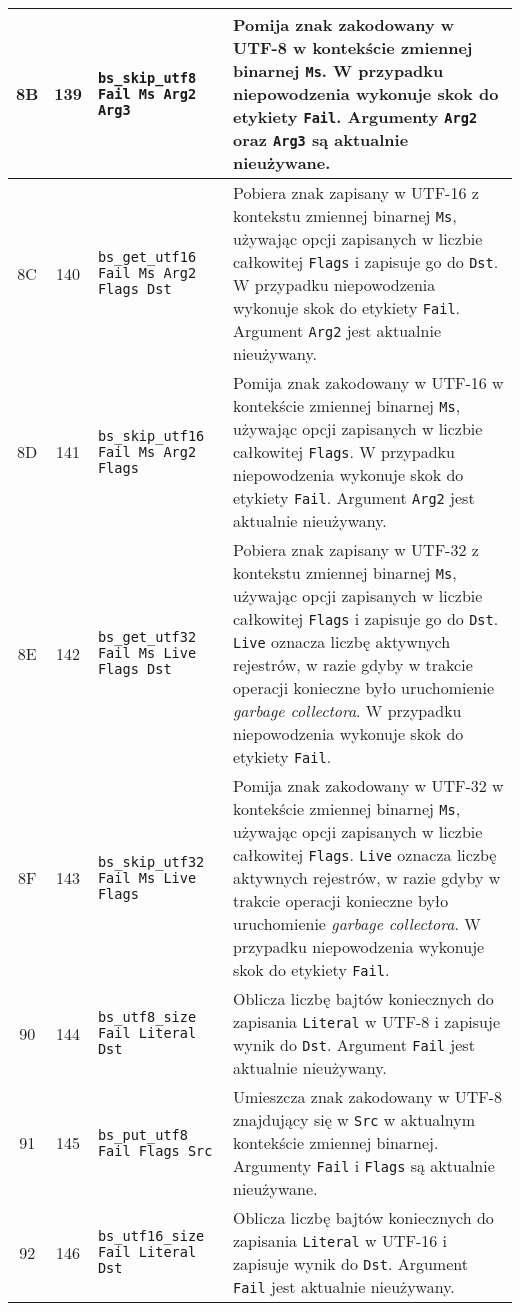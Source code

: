\begin{longtable}{|c|c|p{5cm}|p{7cm}|}
\hline
8B & 139 & \texttt{bs\_skip\_utf8 Fail Ms Arg2 Arg3} & Pomija znak zakodowany w UTF-8 w kontekście zmiennej binarnej \texttt{Ms}. W przypadku niepowodzenia wykonuje skok do etykiety \texttt{Fail}. Argumenty \texttt{Arg2} oraz \texttt{Arg3} są aktualnie nieużywane. \\
\hline
8C & 140 & \texttt{bs\_get\_utf16 Fail Ms Arg2 Flags Dst} & Pobiera znak zapisany w UTF-16 z kontekstu zmiennej binarnej \texttt{Ms}, używając opcji zapisanych w liczbie całkowitej \texttt{Flags} i zapisuje go do \texttt{Dst}. W przypadku niepowodzenia wykonuje skok do etykiety \texttt{Fail}. Argument \texttt{Arg2} jest aktualnie nieużywany. \\
\hline
8D & 141 & \texttt{bs\_skip\_utf16 Fail Ms Arg2 Flags} & Pomija znak zakodowany w UTF-16 w kontekście zmiennej binarnej \texttt{Ms}, używając opcji zapisanych w liczbie całkowitej \texttt{Flags}. W przypadku niepowodzenia wykonuje skok do etykiety \texttt{Fail}. Argument \texttt{Arg2} jest aktualnie nieużywany.\\
\hline
8E & 142 & \texttt{bs\_get\_utf32 Fail Ms Live Flags Dst} & Pobiera znak zapisany w UTF-32 z kontekstu zmiennej binarnej \texttt{Ms}, używając opcji zapisanych w liczbie całkowitej \texttt{Flags} i zapisuje go do \texttt{Dst}. \texttt{Live} oznacza liczbę aktywnych rejestrów, w razie gdyby w trakcie operacji konieczne było uruchomienie \emph{garbage collectora}. W przypadku niepowodzenia wykonuje skok do etykiety \texttt{Fail}. \\
\hline
8F & 143 & \texttt{bs\_skip\_utf32 Fail Ms Live Flags} & Pomija znak zakodowany w UTF-32 w kontekście zmiennej binarnej \texttt{Ms}, używając opcji zapisanych w liczbie całkowitej \texttt{Flags}. \texttt{Live} oznacza liczbę aktywnych rejestrów, w razie gdyby w trakcie operacji konieczne było uruchomienie \emph{garbage collectora}. W przypadku niepowodzenia wykonuje skok do etykiety \texttt{Fail}. \\
\hline
90 & 144 & \texttt{bs\_utf8\_size Fail Literal Dst} & Oblicza liczbę bajtów koniecznych do zapisania \texttt{Literal} w UTF-8 i zapisuje wynik do \texttt{Dst}. Argument \texttt{Fail} jest aktualnie nieużywany. \\
\hline
91 & 145 & \texttt{bs\_put\_utf8 Fail Flags Src} & Umieszcza znak zakodowany w UTF-8 znajdujący się w \texttt{Src} w aktualnym kontekście zmiennej binarnej. Argumenty \texttt{Fail} i \texttt{Flags} są aktualnie nieużywane. \\
\hline
92 & 146 & \texttt{bs\_utf16\_size Fail Literal Dst} & Oblicza liczbę bajtów koniecznych do zapisania \texttt{Literal} w UTF-16 i zapisuje wynik do \texttt{Dst}. Argument \texttt{Fail} jest aktualnie nieużywany. \\

\end{longtable}
